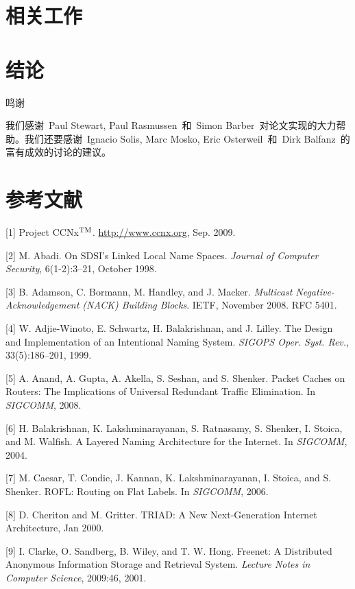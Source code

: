 \section{相关工作}
\label{sec:7}


\section{结论}
\label{sec:8}

\heiti
鸣谢

\songti
我们感谢~Paul Stewart, Paul Rasmussen~和~Simon Barber~对论文实现的大力帮助。我们还要感谢~Ignacio Solis, Marc Mosko, Eric Osterweil~和~Dirk Balfanz~的富有成效的讨论的建议。

\section{参考文献}
\def\tm{\leavevmode\hbox{$\rm {}^{TM}$}} %
[1] Project CCNx\tm. \url{http://www.ccnx.org}, Sep. 2009.

[2] M. Abadi. On SDSI’s Linked Local Name Spaces. \emph{Journal of Computer Security}, 6(1-2):3–21, October 1998.

[3] B. Adamson, C. Bormann, M. Handley, and J. Macker.
\emph{Multicast Negative-Acknowledgement (NACK) Building
Blocks}. IETF, November 2008. RFC 5401.

[4] W. Adjie-Winoto, E. Schwartz, H. Balakrishnan, and
J. Lilley. The Design and Implementation of an Intentional Naming System. \emph{SIGOPS Oper. Syst. Rev.}, 33(5):186–201, 1999.

[5] A. Anand, A. Gupta, A. Akella, S. Seshan, and S. Shenker. Packet Caches on Routers: The Implications of Universal Redundant Traffic Elimination. In \emph{SIGCOMM}, 2008.

[6] H. Balakrishnan, K. Lakshminarayanan, S. Ratnasamy, S. Shenker, I. Stoica, and M. Walfish. A Layered Naming Architecture for the Internet. In \emph{SIGCOMM}, 2004.

[7] M. Caesar, T. Condie, J. Kannan, K. Lakshminarayanan,
I. Stoica, and S. Shenker. ROFL: Routing on Flat Labels. In \emph{SIGCOMM}, 2006.

[8] D. Cheriton and M. Gritter. TRIAD: A New Next-Generation Internet Architecture, Jan 2000.

[9] I. Clarke, O. Sandberg, B. Wiley, and T. W. Hong. Freenet: A Distributed Anonymous Information Storage and Retrieval System. \emph{Lecture Notes in Computer Science}, 2009:46, 2001.


